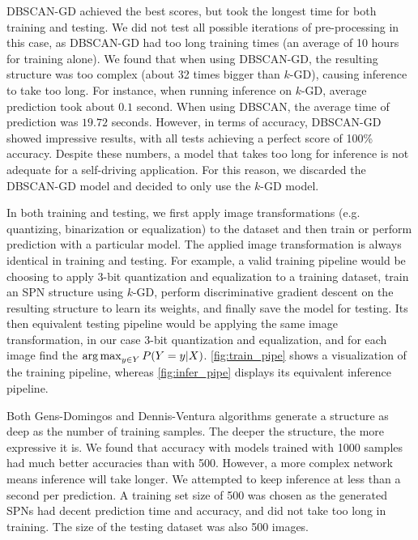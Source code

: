DBSCAN-GD achieved the best scores, but took the longest time for both training and testing. We did
not test all possible iterations of pre-processing in this case, as DBSCAN-GD had too long training
times (an average of 10 hours for training alone). We found that when using DBSCAN-GD, the
resulting structure was too complex (about 32 times bigger than $k$-GD), causing inference to take
too long. For instance, when running inference on $k$-GD, average prediction took about $0.1$
second.  When using DBSCAN, the average time of prediction was $19.72$ seconds. However, in terms
of accuracy, DBSCAN-GD showed impressive results, with all tests achieving a perfect score of 100\%
accuracy. Despite these numbers, a model that takes too long for inference is not adequate for a
self-driving application. For this reason, we discarded the DBSCAN-GD model and decided to only use
the $k$-GD model.

In both training and testing, we first apply image transformations (e.g. quantizing, binarization
or equalization) to the dataset and then train or perform prediction with a particular model. The
applied image transformation is always identical in training and testing. For example, a valid
training pipeline would be choosing to apply 3-bit quantization and equalization to a training
dataset, train an SPN structure using $k$-GD, perform discriminative gradient descent on the
resulting structure to learn its weights, and finally save the model for testing. Its then
equivalent testing pipeline would be applying the same image transformation, in our case 3-bit
quantization and equalization, and for each image find the $\operatorname*{arg\,max}_{y\in Y} P(Y=y|X)$.
\autoref{fig:train_pipe} shows a visualization of the training pipeline, whereas
\autoref{fig:infer_pipe} displays its equivalent inference pipeline.

Both Gens-Domingos and Dennis-Ventura algorithms generate a structure as deep as the number of
training samples. The deeper the structure, the more expressive it is. We found that accuracy with
models trained with 1000 samples had much better accuracies than with 500. However, a more complex
network means inference will take longer. We attempted to keep inference at less than a second per
prediction. A training set size of 500 was chosen as the generated SPNs had decent prediction time
and accuracy, and did not take too long in training. The size of the testing dataset was also 500
images.

